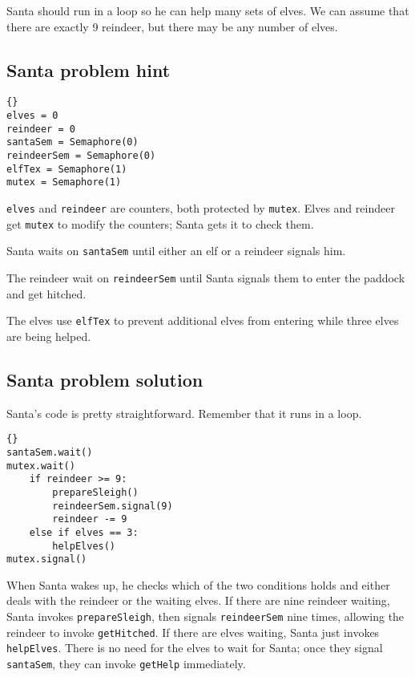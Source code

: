 \documentclass{book}
\newcommand{\clearemptydoublepage}{\newpage\cleardoublepage}
\begin{document}
Santa should run in a loop so he can help many sets of elves.
We can assume that there are exactly 9 reindeer, but there may
be any number of elves.  

\clearemptydoublepage
\subsection {Santa problem hint}

\begin{lstlisting}[title={Santa problem hint}]{}
elves = 0
reindeer = 0
santaSem = Semaphore(0)
reindeerSem = Semaphore(0)
elfTex = Semaphore(1)
mutex = Semaphore(1)
\end{lstlisting}

{\tt elves} and {\tt reindeer} are counters, both protected
by {\tt mutex}.  Elves and reindeer get {\tt mutex} to modify the
counters; Santa gets it to check them.

Santa waits on {\tt santaSem} until either an elf or a reindeer
signals him.

The reindeer wait on {\tt reindeerSem} until Santa signals them to
enter the paddock and get hitched.

The elves use {\tt elfTex} to prevent additional elves from
entering while three elves are being helped.


\clearemptydoublepage
\subsection {Santa problem solution}

Santa's code is pretty straightforward.  Remember that it
runs in a loop.

\begin{lstlisting}[title={Santa problem solution (Santa)}]{}
santaSem.wait()
mutex.wait()
    if reindeer >= 9:
        prepareSleigh()
        reindeerSem.signal(9)
        reindeer -= 9
    else if elves == 3:
        helpElves()
mutex.signal()
\end{lstlisting}

When Santa wakes up, he checks which of the two conditions
holds and either deals with the reindeer or the waiting elves.
If there are nine reindeer waiting,
Santa invokes {\tt prepareSleigh}, then signals {\tt reindeerSem}
nine times, allowing the reindeer to invoke {\tt getHitched}.
If there are elves waiting, Santa just
invokes {\tt helpElves}.  There is no need for the elves to wait
for Santa; once they signal {\tt santaSem}, they can
invoke {\tt getHelp} immediately.
\end{document}
